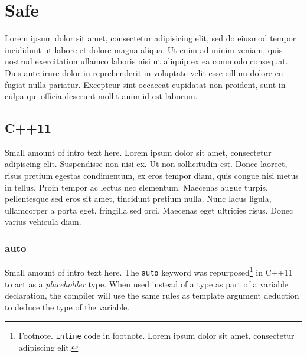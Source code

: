 \documentclass[twoside,10pt,letterpaper,usenames]{newstyle-PearsonGeneric-7-38}
\author{}
\date{}
\begin{document}




% 
% 
% 

\cleardoublepage %

\chapter{Safe}\label{SafeChap}
 
    
Lorem ipsum dolor sit amet, consectetur adipisicing elit, sed do eiusmod tempor incididunt ut labore et dolore magna aliqua. Ut enim ad minim veniam, quis nostrud exercitation ullamco laboris nisi ut aliquip ex ea commodo consequat. Duis aute irure dolor in reprehenderit in voluptate velit esse cillum dolore eu fugiat nulla pariatur. Excepteur sint occaecat cupidatat non proident, sunt in culpa qui officia deserunt mollit anim id est laborum.


\section[C++11]{C++11}\label{c++11}

Small amount of intro text here. Lorem ipsum dolor sit amet, consectetur
adipiscing elit. Suspendisse non nisi ex. Ut non sollicitudin est. Donec
laoreet, risus pretium egestas condimentum, ex eros tempor diam, quis
congue nisi metus in tellus. Proin tempor ac lectus nec elementum.
Maecenas augue turpis, pellentesque sed eros sit amet, tincidunt pretium
nulla. Nunc lacus ligula, ullamcorper a porta eget, fringilla sed orci.
Maecenas eget ultricies risus. Donec varius vehicula diam.

\subsection[\tt{auto}]{{\SubsecCode auto}}\label{auto}

Small amount of intro text here. The \texttt{auto} keyword was
repurposed{\cprotect\footnote{Footnote. \texttt{inline} code in
  footnote. Lorem ipsum dolor sit amet, consectetur adipiscing elit.}}
in C++11 to act as a \emph{placeholder} type. When used instead of a
type as part of a variable declaration, the {compiler} will use the same
rules as {template argument deduction} to deduce the type of the
variable.
\end{document}
